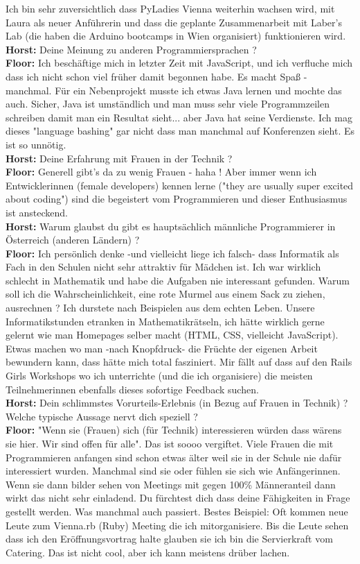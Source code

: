 Ich bin sehr zuversichtlich dass PyLadies Vienna weiterhin wachsen wird, mit Laura als neuer Anführerin und dass die geplante Zusammenarbeit mit Laber's Lab (die haben die Arduino bootcamps in Wien organisiert) funktionieren wird. \\
\textbf{Horst:} Deine Meinung zu anderen Programmiersprachen ? \\
\textbf{Floor:} Ich beschäftige mich in letzter Zeit mit JavaScript, und ich verfluche mich dass ich nicht schon viel früher damit begonnen habe. Es macht Spaß - manchmal. Für ein Nebenprojekt musste ich etwas Java lernen und mochte das auch. Sicher, Java ist umständlich und man muss sehr viele Programmzeilen schreiben damit man ein Resultat sieht... aber Java hat seine Verdienste. Ich mag dieses "language bashing" gar nicht dass man manchmal auf Konferenzen sieht. Es ist so unnötig. \\
\textbf{Horst:} Deine Erfahrung mit Frauen in der Technik ? \\
\textbf{Floor:} Generell gibt's da zu wenig Frauen - haha ! Aber immer wenn ich Entwicklerinnen (female developers) kennen lerne ("they are usually super excited about coding") sind die begeistert vom Programmieren und dieser Enthusiasmus ist ansteckend. \\
\textbf{Horst:} Warum glaubst du gibt es hauptsächlich männliche Programmierer in Österreich (anderen Ländern) ? \\
\textbf{Floor:} Ich persönlich denke -und vielleicht liege ich falsch- dass Informatik als Fach in den Schulen nicht sehr attraktiv für Mädchen ist. Ich war wirklich schlecht in Mathematik und habe die Aufgaben nie interessant gefunden. Warum soll ich die Wahrscheinlichkeit, eine rote Murmel aus einem Sack zu ziehen, ausrechnen ? Ich durstete nach Beispielen aus dem echten Leben. Unsere Informatikstunden etranken in Mathematikrätseln, ich hätte wirklich gerne gelernt wie man Homepages selber macht (HTML, CSS, vielleicht JavaScript). Etwas machen wo man -nach Knopfdruck- die Früchte der eigenen Arbeit bewundern kann, dass hätte mich total fasziniert. Mir fällt auf dass auf den Rails Girls Workshops wo ich unterrichte (und die ich organisiere) die meisten Teilnehmerinnen ebenfalls dieses sofortige Feedback suchen. \\
\textbf{Horst:} Dein schlimmstes Vorurteils-Erlebnis (in Bezug auf Frauen in Technik) ? Welche typische Aussage nervt dich speziell ? \\
\textbf{Floor:} "Wenn sie (Frauen) sich (für Technik) interessieren würden dass wärens sie hier. Wir sind offen für alle". Das ist soooo vergiftet. Viele Frauen die mit Programmieren anfangen sind schon etwas älter weil sie in der Schule nie dafür interessiert wurden. Manchmal sind sie oder fühlen sie sich wie Anfängerinnen. Wenn sie dann bilder sehen von Meetings mit gegen 100\% Männeranteil dann wirkt das nicht sehr einladend. Du fürchtest dich dass deine Fähigkeiten in Frage gestellt werden. Was manchmal auch passiert. Bestes Beispiel: Oft kommen neue Leute zum Vienna.rb (Ruby) Meeting die ich mitorganisiere. Bis die Leute sehen dass ich den Eröffnungsvortrag halte glauben sie ich bin die Servierkraft vom Catering. Das ist nicht cool, aber ich kann meistens drüber lachen. \\
